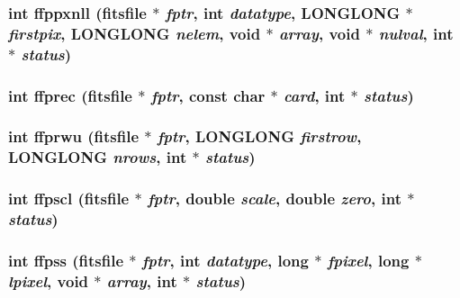 \subsubsection{\setlength{\rightskip}{0pt plus 5cm}int ffppxnll (\bf{fitsfile} $\ast$ {\em fptr}, int {\em datatype}, \bf{LONGLONG} $\ast$ {\em firstpix}, \bf{LONGLONG} {\em nelem}, void $\ast$ {\em array}, void $\ast$ {\em nulval}, int $\ast$ {\em status})}\label{fitsio_8h_a46e0229ce53eaeb3e024daff7cda152}


\subsubsection{\setlength{\rightskip}{0pt plus 5cm}int ffprec (\bf{fitsfile} $\ast$ {\em fptr}, const char $\ast$ {\em card}, int $\ast$ {\em status})}\label{fitsio_8h_b8a4ffee9072c15ac03cdb0c28a50730}


\subsubsection{\setlength{\rightskip}{0pt plus 5cm}int ffprwu (\bf{fitsfile} $\ast$ {\em fptr}, \bf{LONGLONG} {\em firstrow}, \bf{LONGLONG} {\em nrows}, int $\ast$ {\em status})}\label{fitsio_8h_a9ad4a1b317ff4337067d66288c9a245}


\subsubsection{\setlength{\rightskip}{0pt plus 5cm}int ffpscl (\bf{fitsfile} $\ast$ {\em fptr}, double {\em scale}, double {\em zero}, int $\ast$ {\em status})}\label{fitsio_8h_55e6ba51c52d4c9ea77e745d5029a42c}


\subsubsection{\setlength{\rightskip}{0pt plus 5cm}int ffpss (\bf{fitsfile} $\ast$ {\em fptr}, int {\em datatype}, long $\ast$ {\em fpixel}, long $\ast$ {\em lpixel}, void $\ast$ {\em array}, int $\ast$ {\em status})}\label{fitsio_8h_42bee00082b5cb488fa8a440392392b1}


